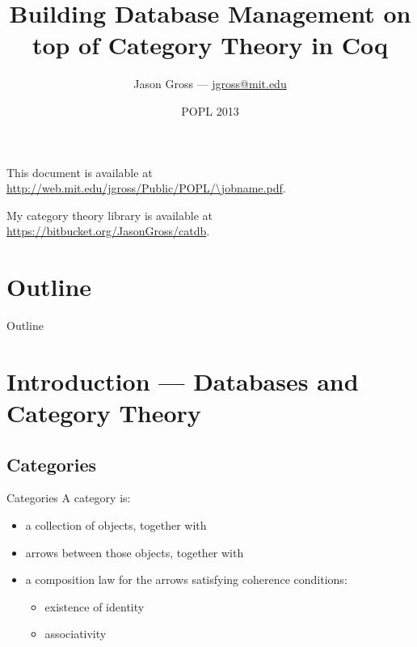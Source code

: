 \documentclass[utf8x]{beamer}
\begin{document}
\title[Database Management on top of Category Theory in Coq]{Building Database Management on top of Category Theory in Coq}
\date{POPL 2013}
\author{Jason Gross --- \href{mailto:jgross@mit.edu}{jgross@mit.edu}}

\begin{frame}
  \titlepage
  This document is available at \url{http://web.mit.edu/jgross/Public/POPL/\jobname.pdf}.
  
  My category theory library is available at \url{https://bitbucket.org/JasonGross/catdb}.
\end{frame}

\section*{Outline}
  \begin{frame}{Outline}
    \tableofcontents[pausesections]
  \end{frame}
  
\section{Introduction --- Databases and Category Theory}    
  \subsection{Categories}
    \begin{frame}{Categories}
      A category is:
      \begin{itemize}
        \item
          a collection of objects, \pause together with
        \item
          arrows between those objects, \pause together with
        \item
          a composition law for the arrows satisfying coherence conditions:
          \begin{itemize}
            \item existence of identity
            \item associativity
          \end{itemize} \pause
      \end{itemize}
      \begin{center}
      \end{center}
    \end{frame}
    
\end{document}
